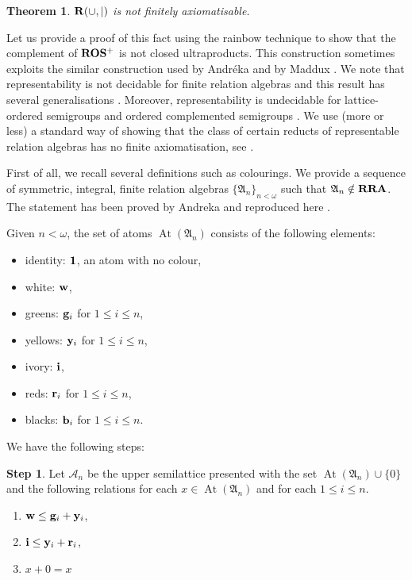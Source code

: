 \documentclass[a4paper]{article}
\theoremstyle{defin}
\theoremstyle{theorem}
\newtheorem{theorem}{Theorem}
\theoremstyle{prop}
\theoremstyle{lemma}
\theoremstyle{ex}
\theoremstyle{col}
\begin{document}
\begin{theorem}
  ${\bf R}(\cup, |)$ is not finitely axiomatisable.
\end{theorem}

Let us provide a proof of this fact using the rainbow technique \cite{hirsch2002relation} to show that the complement of ${\bf ROS^{+}}$ is not closed ultraproducts. This construction sometimes exploits the similar construction used by Andr{\'e}ka \cite{andreka1991representations} and by Maddux \cite{maddux_1989}.
We note that representability is not decidable for finite relation algebras \cite{hirsch2001representability} and this result has several generalisations \cite{hirsch2012undecidability}. Moreover, representability is undecidable for lattice-ordered semigroups and ordered complemented semigroups \cite{neuzerling2016undecidability}. We use (more or less) a standard way of showing that the class of certain reducts of representable relation algebras has no finite axiomatisation, see \cite{hodkinson2000axiomatizability} \cite{hirsch1997step}.

First of all, we recall several definitions such as colourings. We provide a sequence of symmetric, integral, finite relation algebras $\{ \mathfrak{A}_n \}_{n < \omega}$ such that $\mathfrak{A}_n \notin {\bf RRA}$. The statement has been proved by Andreka \cite{andreka1991representations} and reproduced here \cite{andreka2011axiomatizability}.

Given $n < \omega$, the set of atoms $\operatorname{At}(\mathfrak{A}_n)$ consists of the following elements:
\begin{itemize}
\item identity: ${\bf 1}$, an atom with no colour,
\item white: ${\bf w}$,
\item greens: ${\bf g}_i$ for $1 \leq i \leq n$,
\item yellows: ${\bf y}_i$ for $1 \leq i \leq n$,
\item ivory: ${\bf i}$,
\item reds: ${\bf r}_i$ for $1 \leq i \leq n$,
\item blacks: ${\bf b}_i$ for $1 \leq i \leq n$.
\end{itemize}

We have the following steps:

\vspace{\baselineskip}

{\bf Step 1}. Let $\mathcal{A}_n$ be the upper semilattice presented with the set $\operatorname{At}(\mathfrak{A}_n) \cup \{ 0 \}$ and the following relations for each $x \in \operatorname{At}(\mathfrak{A}_n)$ and for each $1 \leq i \leq n$.
\begin{enumerate}
  \item ${\bf w} \leq {\bf g}_i + {\bf y}_i$,
  \item ${\bf i} \leq {\bf y}_i + {\bf r}_i$,
  \item $x + 0 = x$
\end{enumerate}
\end{document}
